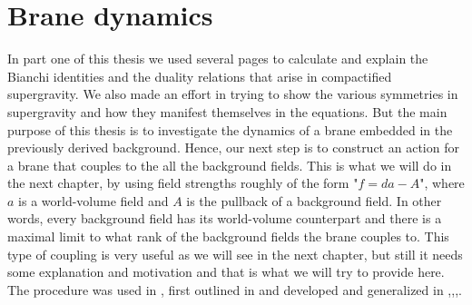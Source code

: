 \chapter{Brane dynamics}
\label{sec:dynamics}

In part one of this thesis we used several pages to calculate and explain the Bianchi identities and the duality relations that arise in compactified supergravity.
We also made an effort in trying to show the various symmetries in supergravity and how they manifest themselves in the equations. 
But the main purpose of this thesis is to investigate the dynamics of a brane embedded in the previously derived background.
Hence, our next step is to construct an action for a brane that couples to the all the background fields.
This is what we will do in the next chapter, by using field strengths roughly of the form "$f=da-A$", where $a$ is a world-volume field and $A$ is the pullback of a background field. 
In other words, every background field has its world-volume counterpart and there is a maximal limit to what rank of the background fields the brane couples to. 
This type of coupling is very useful as we will see in the next chapter, but still it needs some explanation and motivation and that is what we will try to provide here. 
The procedure was used in \cite{artikeln}, first outlined in \cite{valskriven} and developed and generalized in \cite{ref10},\cite{ref11},\cite{ref12},\cite{ref13}.

